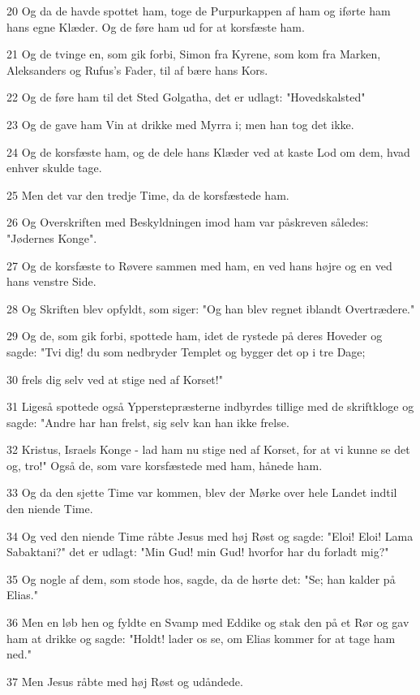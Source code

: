\par 20 Og da de havde spottet ham, toge de Purpurkappen af ham og iførte ham hans egne Klæder. Og de føre ham ud for at korsfæste ham.
\par 21 Og de tvinge en, som gik forbi, Simon fra Kyrene, som kom fra Marken, Aleksanders og Rufus's Fader, til af bære hans Kors.
\par 22 Og de føre ham til det Sted Golgatha, det er udlagt: "Hovedskalsted"
\par 23 Og de gave ham Vin at drikke med Myrra i; men han tog det ikke.
\par 24 Og de korsfæste ham, og de dele hans Klæder ved at kaste Lod om dem, hvad enhver skulde tage.
\par 25 Men det var den tredje Time, da de korsfæstede ham.
\par 26 Og Overskriften med Beskyldningen imod ham var påskreven således: "Jødernes Konge".
\par 27 Og de korsfæste to Røvere sammen med ham, en ved hans højre og en ved hans venstre Side.
\par 28 Og Skriften blev opfyldt, som siger: "Og han blev regnet iblandt Overtrædere."
\par 29 Og de, som gik forbi, spottede ham, idet de rystede på deres Hoveder og sagde: "Tvi dig! du som nedbryder Templet og bygger det op i tre Dage;
\par 30 frels dig selv ved at stige ned af Korset!"
\par 31 Ligeså spottede også Ypperstepræsterne indbyrdes tillige med de skriftkloge og sagde: "Andre har han frelst, sig selv kan han ikke frelse.
\par 32 Kristus, Israels Konge - lad ham nu stige ned af Korset, for at vi kunne se det og, tro!" Også de, som vare korsfæstede med ham, hånede ham.
\par 33 Og da den sjette Time var kommen, blev der Mørke over hele Landet indtil den niende Time.
\par 34 Og ved den niende Time råbte Jesus med høj Røst og sagde: "Eloi! Eloi! Lama Sabaktani?" det er udlagt: "Min Gud! min Gud! hvorfor har du forladt mig?"
\par 35 Og nogle af dem, som stode hos, sagde, da de hørte det: "Se; han kalder på Elias."
\par 36 Men en løb hen og fyldte en Svamp med Eddike og stak den på et Rør og gav ham at drikke og sagde: "Holdt! lader os se, om Elias kommer for at tage ham ned."
\par 37 Men Jesus råbte med høj Røst og udåndede.
